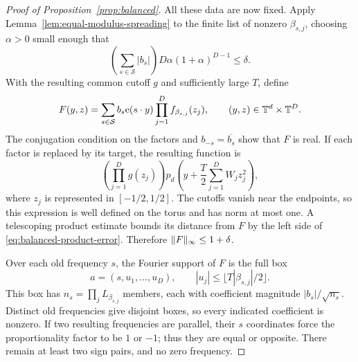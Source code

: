 \begin{proof}[Proof of Proposition~\ref{prop:balanced}]
All these data are now fixed.  Apply
Lemma~\ref{lem:equal-modulus-spreading} to the finite list of nonzero
$\beta_{s,j}$, choosing $\alpha>0$ small enough that
\begin{equation}\label{eq:balanced-product-error}
 \left(\sum_{s\in\mathcal S}|b_s|\right)
 D\alpha(1+\alpha)^{D-1}\le\delta.
\end{equation}
With the resulting common cutoff $g$ and sufficiently large $T$, define
\[
 F(y,z)=\sum_{s\in\mathcal S}b_s\mathrm e(s\cdot y)
                  \prod_{j=1}^D f_{\beta_{s,j}}(z_j),
 \qquad (y,z)\in\mathbb T^d\times\mathbb T^D.
\]
The conjugation condition on the factors and
$b_{-s}=\overline{b_s}$ show that $F$ is real.
If each factor is replaced by its target, the resulting function is
\[
 \left(\prod_{j=1}^Dg(z_j)\right)
 p_d\left(y+\frac T2\sum_{j=1}^D W_jz_j^2\right),
\]
where $z_j$ is represented in $[-1/2,1/2]$.  The cutoffs vanish near
the endpoints, so this expression is well defined on the torus and has
norm at most one.  A telescoping product estimate bounds its distance
from $F$ by the left side of \eqref{eq:balanced-product-error}.
Therefore $\lVert F\rVert_\infty\le1+\delta$.

Over each old frequency $s$, the Fourier support of $F$ is the full box
\[
 a=(s,u_1,\ldots,u_D),\qquad
 |u_j|\le\lfloor T|\beta_{s,j}|/2\rfloor.
\]
This box has $n_s=\prod_jL_{\beta_{s,j}}$ members, each with coefficient
magnitude $|b_s|/\sqrt{n_s}$.  Distinct old frequencies give disjoint
boxes, so every indicated coefficient is nonzero.  If two resulting
frequencies are parallel, their $s$ coordinates force the proportionality
factor to be $1$ or $-1$; thus they are equal or opposite.  There remain
at least two sign pairs, and no zero frequency.


\end{proof}
